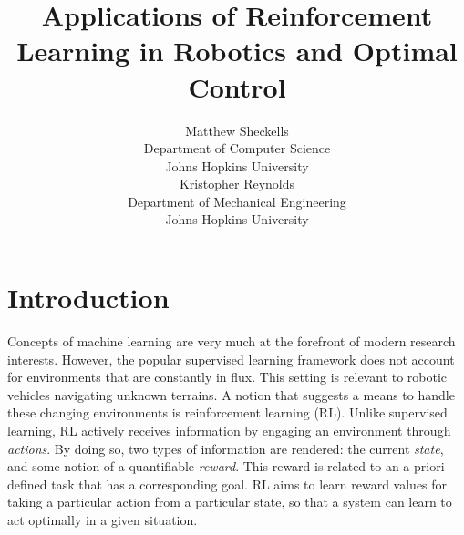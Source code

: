\documentclass{article} %
\title{Applications of Reinforcement Learning in Robotics and Optimal Control}%
\author{
Matthew Sheckells\\
Department of Computer Science\\
Johns Hopkins University\\
\And
Kristopher Reynolds \\
Department of Mechanical Engineering\\
Johns Hopkins University\\
}
\begin{document}
\maketitle

\section{Introduction}
Concepts of machine learning are very much at the forefront of modern research interests. However, the popular supervised learning framework does not account for environments that are constantly in flux. This setting is relevant to robotic vehicles navigating unknown terrains. A notion that suggests a means to handle these changing environments is reinforcement learning (RL). Unlike supervised learning, RL actively receives information by engaging an environment through \textit{actions}. By doing so, two types of information are rendered: the current \textit{state}, and some notion of a quantifiable \textit{reward}. This reward is related to an a priori defined task that has a corresponding goal. RL aims to learn reward values for taking a particular action from a particular state, so that a system can learn to act optimally in a given situation.
\end{document}
